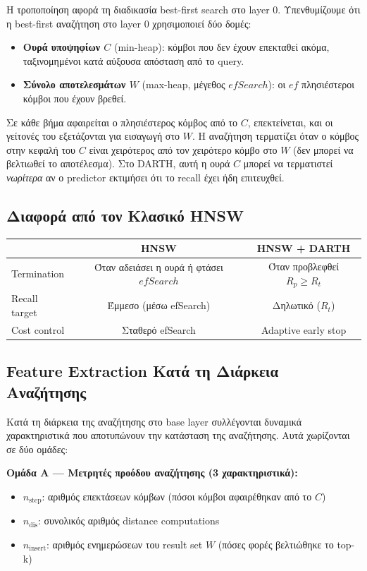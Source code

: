 \documentclass[12pt,a4paper]{article}
\begin{document}
Η τροποποίηση αφορά τη διαδικασία best-first search στο layer 0. Υπενθυμίζουμε ότι η best-first αναζήτηση στο layer 0 χρησιμοποιεί δύο δομές:
\begin{itemize}
  \item \textbf{Ουρά υποψηφίων $C$} (min-heap): κόμβοι που δεν έχουν επεκταθεί ακόμα, ταξινομημένοι κατά αύξουσα απόσταση από το query.
  \item \textbf{Σύνολο αποτελεσμάτων $W$} (max-heap, μέγεθος $efSearch$): οι $ef$ πλησιέστεροι κόμβοι που έχουν βρεθεί.
\end{itemize}
Σε κάθε βήμα αφαιρείται ο πλησιέστερος κόμβος από το $C$, επεκτείνεται, και οι γείτονές του εξετάζονται για εισαγωγή στο $W$. Η αναζήτηση τερματίζει όταν ο κόμβος στην κεφαλή του $C$ είναι χειρότερος από τον χειρότερο κόμβο στο $W$ (δεν μπορεί να βελτιωθεί το αποτέλεσμα). Στο DARTH, αυτή η ουρά $C$ μπορεί να τερματιστεί \emph{νωρίτερα} αν ο predictor εκτιμήσει ότι το recall έχει ήδη επιτευχθεί.

\subsection{Διαφορά από τον Κλασικό HNSW}

\begin{center}
\begin{tabular}{|l|c|c|}
\hline
 & \textbf{HNSW} & \textbf{HNSW + DARTH} \\
\hline
Termination & Όταν αδειάσει η ουρά ή φτάσει $efSearch$ & Όταν προβλεφθεί $R_p \ge R_t$ \\
Recall target & Έμμεσο (μέσω efSearch) & Δηλωτικό ($R_t$) \\
Cost control & Σταθερό efSearch & Adaptive early stop \\
\hline
\end{tabular}
\end{center}

\subsection{Feature Extraction Κατά τη Διάρκεια Αναζήτησης}

Κατά τη διάρκεια της αναζήτησης στο base layer συλλέγονται δυναμικά χαρακτηριστικά που αποτυπώνουν την κατάσταση της αναζήτησης. Αυτά χωρίζονται σε δύο ομάδες:

\textbf{Ομάδα Α — Μετρητές προόδου αναζήτησης (3 χαρακτηριστικά):}
\begin{itemize}
    \item $n_{\text{step}}$: αριθμός επεκτάσεων κόμβων (πόσοι κόμβοι αφαιρέθηκαν από το $C$)
    \item $n_{\text{dis}}$: συνολικός αριθμός distance computations
    \item $n_{\text{insert}}$: αριθμός ενημερώσεων του result set $W$ (πόσες φορές βελτιώθηκε το top-k)
\end{itemize}
\end{document}
